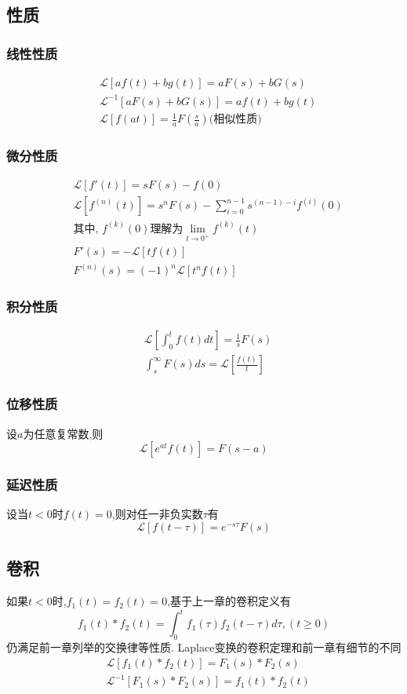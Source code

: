 \documentclass[12pt, a4paper, oneside]{ctexart}
\begin{document}
\subsection{性质}
\subsubsection{线性性质}
\begin{align*}
    &\mathcal{L}[af(t)+bg(t)] = aF(s) + bG(s)\\
    &\mathcal{L}^{-1}[aF(s) + bG(s)] = af(t)+bg(t)\\
    &\mathcal{L}[f(at)] = \frac{1}{a}F\left(\frac{s}{a}\right)\text{(相似性质)}
\end{align*}
\subsubsection{微分性质}
\begin{align*}
    &\mathcal{L}[f'(t)] = sF(s) - f(0)\\
    &\mathcal{L}\left[f^{(n)}(t)\right] = s^nF(s) - \sum_{i=0}^{n-1}s^{(n-1)-i}f^{(i)}(0)\\
    &\text{其中, }f^{(k)}(0) \text{理解为}\lim_{t \to 0^+}f^{(k)}(t)\\
    &F'(s) = -\mathcal{L}[tf(t)]\\
    &F^{(n)}(s) = (-1)^n\mathcal{L}[t^nf(t)]
\end{align*}
\subsubsection{积分性质}
\begin{align*}
    &\mathcal{L}\left[\int_{0}^{t}f(t)dt\right] = \frac{1}{s}F(s)\\
    &\int_{s}^{\infty}F(s)ds = \mathcal{L}\left[\frac{f(t)}{t}\right]
\end{align*}
\subsubsection{位移性质}
设$a$为任意复常数,则
\[
    \mathcal{L}\left[e^{at}f(t)\right] = F(s-a)
\]
\subsubsection{延迟性质}
设当$t<0$时$f(t) = 0$,则对任一非负实数$\tau$有
\[
    \mathcal{L}[f(t-\tau)] = e^{-s\tau}F(s)
\]
\subsection{卷积}
如果$t<0$时,$f_1(t) = f_2(t) = 0$,基于上一章的卷积定义有
\[
    f_1(t) * f_2(t) = \int_{0}^{t}f_1(\tau)f_2(t-\tau)d\tau,(t\ge 0)
\]
仍满足前一章列举的交换律等性质.
Laplace变换的卷积定理和前一章有细节的不同
\begin{align*}
    &\mathcal{L}[f_1(t) * f_2(t)] = F_1(s) * F_2(s)\\
    &\mathcal{L}^{-1}[F_1(s) * F_2(s)] = f_1(t) * f_2(t)
\end{align*}
\end{document}
